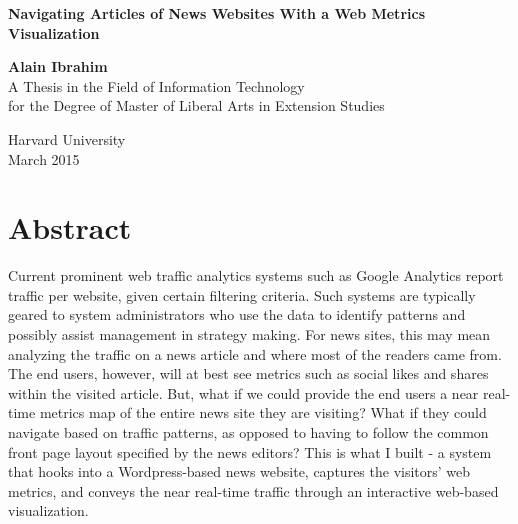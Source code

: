 \documentclass[12pt]{article}
\begin{document}

\begin{titlepage}
    \begin{center}
        
        \begin{doublespace}        
        \textbf{\Large Navigating Articles of News Websites With a Web Metrics Visualization}
        \vfill

        \vspace{2in}
        \textbf{\Large Alain Ibrahim} \\
		\vspace{2in}
        A Thesis in the Field of Information Technology \\
        for the Degree of Master of Liberal Arts in Extension Studies \\

        \vspace{.5in} 

        
        Harvard University \\
        \vspace {.4in}
        March 2015        

		\end{doublespace}        
        
        \vfill
         
    \end{center}
\end{titlepage}


\section{Abstract}

Current prominent web traffic analytics systems such as Google Analytics report traffic per website, given certain filtering criteria. Such systems are typically geared to system administrators who use the data to identify patterns and possibly assist management in strategy making. For news sites, this may mean analyzing the traffic on a news article and where most of the readers came from. The end users, however, will at best see metrics such as social likes and shares within the visited article. But, what if we could provide the end users a near real-time metrics map of the entire news site they are visiting? What if they could navigate based on traffic patterns, as opposed to having to follow the common front page layout specified by the news editors? This is what I built - a system that hooks into a Wordpress-based news website, captures the visitors' web metrics, and conveys the near real-time traffic through an interactive web-based visualization.
\newpage
\end{document}
